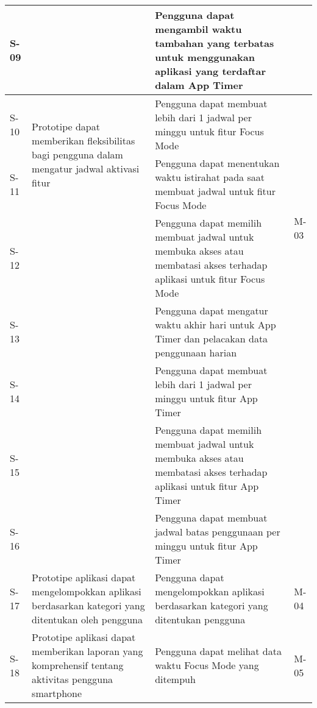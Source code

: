 \begin{longtable}[c]{|p{}|p{}|p{}|p{}|}
  S-09 &  
  & Pengguna dapat mengambil waktu tambahan yang terbatas untuk menggunakan aplikasi yang terdaftar dalam App Timer
  
  & \\ \hline
  S-10
  & \multirow{2}{0.3\textwidth}{Prototipe dapat memberikan fleksibilitas bagi
  pengguna dalam mengatur jadwal aktivasi fitur}
  & Pengguna dapat membuat lebih dari 1 jadwal per minggu untuk fitur Focus Mode
  & \multirow{4}{0.1\textwidth}{M-03} \\ \cline{1-1} \cline{3-3}
  
  S-11 &  
  & Pengguna dapat menentukan waktu istirahat pada saat membuat jadwal untuk fitur Focus Mode
  & \\ \cline{1-1} \cline{3-3}
  
  S-12 &  
  & Pengguna dapat memilih membuat jadwal untuk membuka akses atau membatasi akses terhadap aplikasi untuk fitur Focus Mode   
  & \\ \cline{1-1} \cline{3-3}
  
  S-13 &  
  & Pengguna dapat mengatur waktu akhir hari untuk App Timer dan pelacakan data penggunaan harian  
  & \\ \cline{1-1} \cline{3-3}
  
  S-14 &  
  & Pengguna dapat membuat lebih dari 1 jadwal per minggu untuk fitur App Timer   
  & \\ \cline{1-1} \cline{3-3}
  
  S-15 &  
  & Pengguna dapat memilih membuat jadwal untuk membuka akses atau membatasi akses terhadap aplikasi untuk fitur App Timer   
  & \\ \cline{1-1} \cline{3-3}
  
  S-16 &  
  & Pengguna dapat membuat jadwal batas penggunaan per minggu untuk fitur App Timer   

  & \\ \hline
  S-17
  & Prototipe aplikasi dapat mengelompokkan aplikasi berdasarkan kategori yang ditentukan oleh pengguna
  & Pengguna dapat mengelompokkan aplikasi berdasarkan kategori yang ditentukan pengguna
  & M-04 \\ \hline
  
  S-18
  & \multirow{3}{0.3\textwidth}{Prototipe aplikasi dapat memberikan laporan yang komprehensif tentang aktivitas pengguna smartphone}
  & Pengguna dapat melihat data waktu Focus Mode yang ditempuh
  & \multirow{2}{0.1\textwidth}{M-05} \\ \cline{1-1} \cline{3-3}


\end{longtable}
